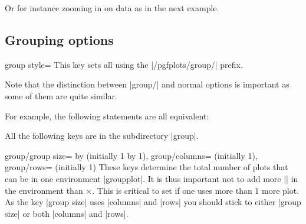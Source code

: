 {\begin{command}{\nextgroupplot{} }
Or for instance zooming in on data as in the next example.
%
\begin{codeexample}[]
\end{codeexample}
\end{command}


\subsection{Grouping options}
\label{sec:pgfplots:group:options}

\begin{pgfplotskey}{group style=}
    This key sets all  using the |/pgfplots/group/| prefix.

    Note that the distinction between |group/| and normal options is important
    as some of them are quite similar.

    For example, the following statements are all equivalent:
\begin{codeexample}
\pgfplotsset{group/a=2,group/b=3}
\pgfplotsset{group/.cd,a=2,b=3}
\end{codeexample}
\end{pgfplotskey}
%
All the following keys are in the subdirectory |group|.

\begin{pgfplotskeylist}{%
    group/group size= by  (initially 1 by 1),
    group/columns= (initially 1),
    group/rows= (initially 1)%
}
    These keys determine the total number of plots that can be in one
    environment |groupplot|. It is thus important not to add more
    |\nextgroupplot| in the environment than $\times$.
    This is critical to set if one uses more than 1 more plot. As the key
    |group size| uses |columns| and |rows| you should stick to either
    |group size| or both |columns| and |rows|.
\end{pgfplotskeylist}

}
